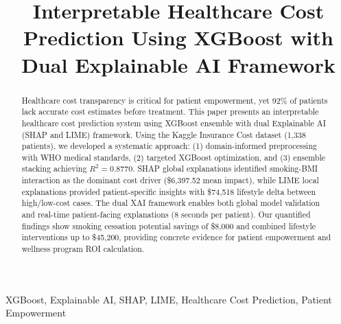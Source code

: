 \documentclass[conference]{IEEEtran}
\begin{document}
\title{Interpretable Healthcare Cost Prediction Using XGBoost with Dual Explainable AI Framework}

\author{
\and
{}
\and
{}
}

\maketitle

\begin{abstract}
Healthcare cost transparency is critical for patient empowerment, yet 92\% of patients lack accurate cost estimates before treatment. This paper presents an interpretable healthcare cost prediction system using XGBoost ensemble with dual Explainable AI (SHAP and LIME) framework. Using the Kaggle Insurance Cost dataset (1,338 patients), we developed a systematic approach: (1) domain-informed preprocessing with WHO medical standards, (2) targeted XGBoost optimization, and (3) ensemble stacking achieving $R^2 = 0.8770$. SHAP global explanations identified smoking-BMI interaction as the dominant cost driver (\$6,397.52 mean impact), while LIME local explanations provided patient-specific insights with \$74,518 lifestyle delta between high/low-cost cases. The dual XAI framework enables both global model validation and real-time patient-facing explanations (8 seconds per patient). Our quantified findings show smoking cessation potential savings of \$8,000 and combined lifestyle interventions up to \$45,200, providing concrete evidence for patient empowerment and wellness program ROI calculation.
\end{abstract}

\begin{IEEEkeywords}
XGBoost, Explainable AI, SHAP, LIME, Healthcare Cost Prediction, Patient Empowerment
\end{IEEEkeywords}
\end{document}
